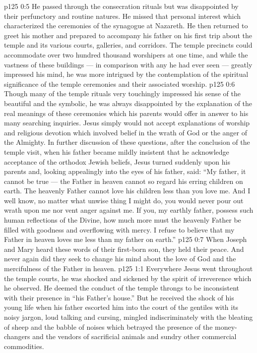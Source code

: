 \vs p125 0:5 He passed through the consecration rituals but was disappointed by their perfunctory and routine natures. He missed that personal interest which characterized the ceremonies of the synagogue at Nazareth. He then returned to greet his mother and prepared to accompany his father on his first trip about the temple and its various courts, galleries, and corridors. The temple precincts could accommodate over two hundred thousand worshipers at one time, and while the vastness of these buildings --- in comparison with any he had ever seen --- greatly impressed his mind, he was more intrigued by the contemplation of the spiritual significance of the temple ceremonies and their associated worship.
\vs p125 0:6 Though many of the temple rituals very touchingly impressed his sense of the beautiful and the symbolic, he was always disappointed by the explanation of the real meanings of these ceremonies which his parents would offer in answer to his many searching inquiries. Jesus simply would not accept explanations of worship and religious devotion which involved belief in the wrath of God or the anger of the Almighty. In further discussion of these questions, after the conclusion of the temple visit, when his father became mildly insistent that he acknowledge acceptance of the orthodox Jewish beliefs, Jesus turned suddenly upon his parents and, looking appealingly into the eyes of his father, said: \textcolor{ubdarkred}{“My father, it cannot be true --- the Father in heaven cannot so regard his erring children on earth. The heavenly Father cannot love his children less than you love me. And I well know, no matter what unwise thing I might do, you would never pour out wrath upon me nor vent anger against me. If you, my earthly father, possess such human reflections of the Divine, how much more must the heavenly Father be filled with goodness and overflowing with mercy. I refuse to believe that my Father in heaven loves me less than my father on earth.”}
\vs p125 0:7 When Joseph and Mary heard these words of their first\hyp{}born son, they held their peace. And never again did they seek to change his mind about the love of God and the mercifulness of the Father in heaven.
\vs p125 1:1 Everywhere Jesus went throughout the temple courts, he was shocked and sickened by the spirit of irreverence which he observed. He deemed the conduct of the temple throngs to be inconsistent with their presence in “his Father’s house.” But he received the shock of his young life when his father escorted him into the court of the gentiles with its noisy jargon, loud talking and cursing, mingled indiscriminately with the bleating of sheep and the babble of noises which betrayed the presence of the money\hyp{}changers and the vendors of sacrificial animals and sundry other commercial commodities.
